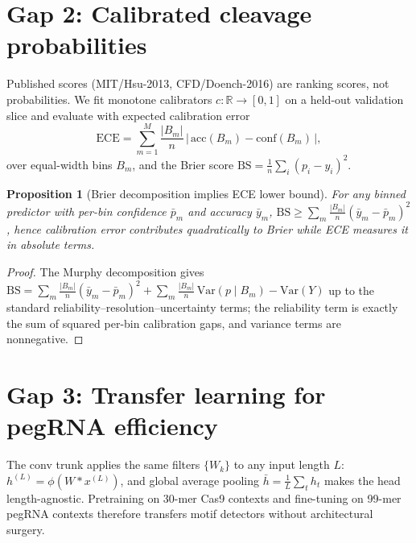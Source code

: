 \documentclass[12pt]{article}
\newtheorem{proposition}{Proposition}
\begin{document}
\section{Gap 2: Calibrated cleavage probabilities}
Published scores (MIT/Hsu-2013, CFD/Doench-2016) are ranking scores, not
probabilities. We fit monotone calibrators $c: \mathbb{R}\to[0,1]$ on a
held-out validation slice and evaluate with expected calibration error
\begin{equation}
\mathrm{ECE} = \sum_{m=1}^{M} \frac{|B_m|}{n}\, \big|\,\mathrm{acc}(B_m) - \mathrm{conf}(B_m)\,\big|,
\end{equation}
over equal-width bins $B_m$, and the Brier score
$\mathrm{BS} = \frac{1}{n}\sum_i (p_i - y_i)^2$.
\begin{proposition}[Brier decomposition implies ECE lower bound]
For any binned predictor with per-bin confidence $\bar p_m$ and accuracy
$\bar y_m$, $\mathrm{BS} \ge \sum_m \frac{|B_m|}{n}(\bar y_m - \bar p_m)^2$,
hence calibration error contributes quadratically to Brier while ECE
measures it in absolute terms.
\end{proposition}
\begin{proof}
The Murphy decomposition gives
$\mathrm{BS} = \sum_m \frac{|B_m|}{n}(\bar y_m - \bar p_m)^2
+ \sum_m \frac{|B_m|}{n}\,\mathrm{Var}(p \mid B_m)
- \mathrm{Var}(Y)$ up to the standard reliability--resolution--uncertainty
terms; the reliability term is exactly the sum of squared per-bin
calibration gaps, and variance terms are nonnegative.
\end{proof}

\section{Gap 3: Transfer learning for pegRNA efficiency}
The conv trunk applies the same filters $\{W_k\}$ to any input length $L$:
$h^{(L)} = \phi(W * x^{(L)})$, and global average pooling
$\bar h = \frac{1}{L}\sum_t h_t$ makes the head length-agnostic. Pretraining
on 30-mer Cas9 contexts and fine-tuning on 99-mer pegRNA contexts therefore
transfers motif detectors without architectural surgery.
\end{document}
